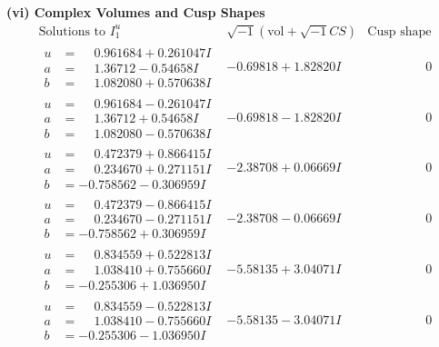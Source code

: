\documentclass[1p]{elsarticle_modified}
\theoremstyle{definition}
\newcommand{\I}{\sqrt{-1}}
\begin{document}
\newpage\flushleft \textbf{(vi) Complex Volumes and Cusp Shapes}
$$\begin{array}{c|c|c}  
\text{Solutions to }I^u_{1}& \I (\text{vol} + \sqrt{-1}CS) & \text{Cusp shape}\\
 \hline 
\begin{aligned}
u &= \phantom{-}0.961684 + 0.261047 I \\
a &= \phantom{-}1.36712 - 0.54658 I \\
b &= \phantom{-}1.082080 + 0.570638 I\end{aligned}
 & -0.69818 + 1.82820 I & \phantom{-0.000000 } 0 \\ \hline\begin{aligned}
u &= \phantom{-}0.961684 - 0.261047 I \\
a &= \phantom{-}1.36712 + 0.54658 I \\
b &= \phantom{-}1.082080 - 0.570638 I\end{aligned}
 & -0.69818 - 1.82820 I & \phantom{-0.000000 } 0 \\ \hline\begin{aligned}
u &= \phantom{-}0.472379 + 0.866415 I \\
a &= \phantom{-}0.234670 + 0.271151 I \\
b &= -0.758562 - 0.306959 I\end{aligned}
 & -2.38708 + 0.06669 I & \phantom{-0.000000 } 0 \\ \hline\begin{aligned}
u &= \phantom{-}0.472379 - 0.866415 I \\
a &= \phantom{-}0.234670 - 0.271151 I \\
b &= -0.758562 + 0.306959 I\end{aligned}
 & -2.38708 - 0.06669 I & \phantom{-0.000000 } 0 \\ \hline\begin{aligned}
u &= \phantom{-}0.834559 + 0.522813 I \\
a &= \phantom{-}1.038410 + 0.755660 I \\
b &= -0.255306 + 1.036950 I\end{aligned}
 & -5.58135 + 3.04071 I & \phantom{-0.000000 } 0 \\ \hline\begin{aligned}
u &= \phantom{-}0.834559 - 0.522813 I \\
a &= \phantom{-}1.038410 - 0.755660 I \\
b &= -0.255306 - 1.036950 I\end{aligned}
 & -5.58135 - 3.04071 I & \phantom{-0.000000 } 0 \\ \hline\begin{aligned}

\end{aligned}
\end{array}$$
\end{document}
